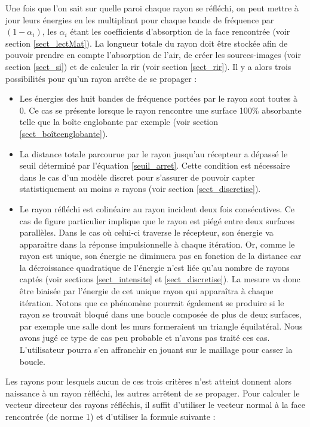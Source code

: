 Une fois que l'on sait sur quelle paroi chaque rayon se réfléchi, on peut mettre à jour leurs énergies en les multipliant pour chaque bande de fréquence par $(1-\alpha_i)$, les $\alpha_i$ étant les coefficients d'absorption de la face rencontrée (voir section \ref{sect_lectMat}). La longueur totale du rayon doit être stockée afin de pouvoir prendre en compte l'absorption de l'air, de créer les sources-images (voir section \ref{sect_si}) et de calculer la \gls{rir}  (voir section \ref{sect_rir}). Il y a alors trois possibilités pour qu'un rayon arrête de se propager : 
\begin{itemize}
	\item Les énergies des huit bandes de fréquence portées par le rayon sont toutes à 0. Ce cas se présente lorsque le rayon rencontre une surface 100\% absorbante telle que la boîte englobante par exemple (voir section \ref{sect_boîteenglobante}).
	\item La distance totale parcourue par le rayon jusqu'au récepteur a dépassé le seuil déterminé par l'équation \ref{seuil_arret}. Cette condition est nécessaire dans le cas d'un modèle discret pour s'assurer de pouvoir capter statistiquement au moins $n$ rayons (voir section \ref{sect_discretise}).
	\item Le rayon réfléchi est colinéaire au rayon incident deux fois consécutives. Ce cas de figure particulier implique que le rayon est piégé entre deux surfaces parallèles. Dans le cas où celui-ci traverse le récepteur, son énergie va apparaitre dans la réponse impulsionnelle à chaque itération. Or, comme le rayon est unique, son énergie ne diminuera pas en fonction de la distance car la décroissance quadratique de l'énergie n'est liée qu'au nombre de rayons captés (voir sections \ref{sect_intensite} et \ref{sect_discretise}). La mesure va donc être biaisée par l'énergie de cet unique rayon qui apparaîtra à chaque itération. Notons que ce phénomène pourrait également se produire si le rayon se trouvait bloqué dans une boucle composée de plus de deux surfaces, par exemple une salle dont les murs formeraient un triangle équilatéral. Nous avons jugé ce type de cas peu probable et n'avons pas traité ces cas. L'utilisateur pourra s'en affranchir en jouant sur le maillage pour casser la boucle. 
\end{itemize}
%
Les rayons pour lesquels aucun de ces trois critères n'est atteint donnent alors naissance à un rayon réfléchi, les autres arrêtent de se propager. Pour calculer le vecteur directeur des rayons réfléchis, il suffit d'utiliser le vecteur normal à la face rencontrée (de norme 1) et d'utiliser la formule suivante :

